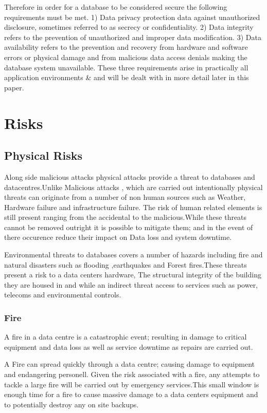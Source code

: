 \documentclass[11pt]{article}
\begin{document}
Therefore in order for a database to be considered secure the following requirements must be met.  1) Data privacy protection data against unauthorized disclosure, sometimes referred to as secrecy or confidentiality.  2) Data integrity refers to the prevention of unauthorized and improper data modification.  3) Data availability refers to the prevention and recovery from hardware and software errors or physical damage and from malicious data access denials making the database system unavailable. These three requirements arise in practically all application environments \cite{BerSand}\&\cite{Thur} and will be dealt with in more detail later in this paper.


\section{Risks}

\subsection{Physical Risks}
Along side malicious attacks physical attacks provide a threat to databases and datacentres.Unlike Malicious attacks , which are carried out intentionally physical threats can originate from a number of non human sources such as Weather, Hardware failure and infrastructure failure. The risk of human related elements is still present ranging from the accidental to the malicious.While these threats cannot be removed outright it is possible to mitigate them; and in the event of there occurence reduce their impact on Data loss and system downtime.	 


Environmental threats to databases covers a number of hazards  including fire  and natural disasters such as flooding ,earthquakes and Forest fires.These threats present a risk to a data centers hardware, The structural integrity of the building they are housed in and while an indirect threat access to services such as power, telecoms and environmental controls.

\subsubsection{Fire}
A fire in a data centre is a catastrophic event; resulting in damage to critical equipment and data loss as well as service downtime as repairs are carried out.

A Fire can spread quickly through a data centre; causing damage to equipment and endangering personell. Given the risk associated with a fire, any attempts to tackle a large fire will be carried out by emergency services.This small window is enough time for a fire to cause massive damage to a data centers 
equipment and to potentially destroy any on site backups.
\end{document}
